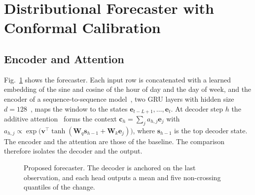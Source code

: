 \section{Distributional Forecaster with Conformal Calibration}
\label{sec:method}
\subsection{Encoder and Attention}
Fig.~\ref{fig:arch} shows the forecaster. Each input row is concatenated with a learned embedding of the sine and cosine of the hour of day and the day of week, and the encoder of a sequence-to-sequence model~\cite{sutskever2014sequence}, two GRU layers with hidden size $d=128$~\cite{cho2014learning}, maps the window to the states $\mathbf{e}_{t-L+1},\dots,\mathbf{e}_t$. At decoder step $h$ the additive attention~\cite{bahdanau2015neural} forms the context $\mathbf{c}_h=\sum_{j}a_{h,j}\mathbf{e}_j$ with $a_{h,j}\propto\exp\big(\mathbf{v}^\top\tanh(\mathbf{W}_q\mathbf{s}_{h-1}+\mathbf{W}_k\mathbf{e}_j)\big)$, where $\mathbf{s}_{h-1}$ is the top decoder state. The encoder and the attention are those of the baseline. The comparison therefore isolates the decoder and the output.

\begin{figure}[t]
  \centering
  \resizebox{\columnwidth}{!}{}
  \caption{Proposed forecaster. The decoder is anchored on the last observation, and each head outputs a mean and five non-crossing quantiles of the change.}
  \label{fig:arch}
\end{figure}

